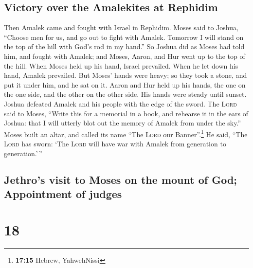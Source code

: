 \hypertarget{victory-over-the-amalekites-at-rephidim}{%
\subsection{Victory over the Amalekites at
Rephidim}\label{victory-over-the-amalekites-at-rephidim}}

 Then Amalek came and fought with Israel in Rephidim.
 Moses said to Joshua, ``Choose men for us, and go out to
fight with Amalek. Tomorrow I will stand on the top of the hill with
God's rod in my hand.''  So Joshua did as Moses had told
him, and fought with Amalek; and Moses, Aaron, and Hur went up to the
top of the hill.  When Moses held up his hand, Israel
prevailed. When he let down his hand, Amalek prevailed. 
But Moses' hands were heavy; so they took a stone, and put it under him,
and he sat on it. Aaron and Hur held up his hands, the one on the one
side, and the other on the other side. His hands were steady until
sunset.  Joshua defeated Amalek and his people with the
edge of the sword.  The \textsc{Lord} said to Moses,
``Write this for a memorial in a book, and rehearse it in the ears of
Joshua: that I will utterly blot out the memory of Amalek from under the
sky.''  Moses built an altar, and called its name ``The
\textsc{Lord} our Banner''.\footnote{\textbf{17:15} Hebrew, YahwehNissi}
 He said, ``The \textsc{Lord} has sworn: `The
\textsc{Lord} will have war with Amalek from generation to
generation.'\,''

\hypertarget{jethros-visit-to-moses-on-the-mount-of-god-appointment-of-judges}{%
\subsection{Jethro's visit to Moses on the mount of God; Appointment of
judges}\label{jethros-visit-to-moses-on-the-mount-of-god-appointment-of-judges}}

\hypertarget{section-17}{%
\section{18}\label{section-17}}

